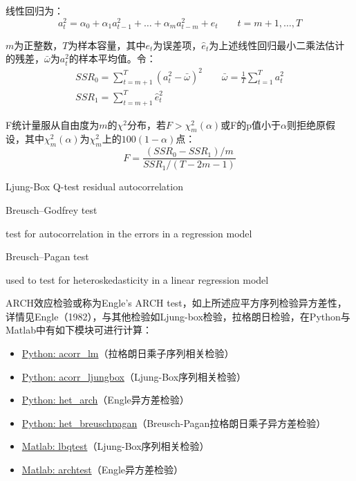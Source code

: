 \documentclass[11pt]{article}
\begin{document}
线性回归为：
\begin{equation*}
    a^2_t = \alpha_0 + \alpha_1 a^{2}_{t-1} + \dots + \alpha_m a^{2}_{t-m} + e_t \qquad t=m+1,\dots,T
\end{equation*}

$m$为正整数，$T$为样本容量，其中$e_t$为误差项，$\hat{e}_t$为上述线性回归最小二乘法估计的残差，$\bar{\omega}$为$a_t^2$的样本平均值。令：
\begin{gather*}
    SSR_0 = \sum_{t=m+1}^{T} (a_t^2 - \bar{\omega})^2 \qquad
    \bar{\omega} = \frac{1}{T} \sum_{t=1}^{T} a_t^2 \\
    SSR_1 = \sum_{t=m+1}^{T} \hat{e}_t^2
\end{gather*}

F统计量服从自由度为$m$的$\chi^2$分布，若$F>\chi_m^2(\alpha)$或F的p值小于$\alpha$则拒绝原假设，其中$\chi_m^2(\alpha)$为$\chi_m^2$上的$100(1-\alpha)$点：
\begin{equation*}
    F = \frac{(SSR_0-SSR_1)/m}{SSR_1/(T-2m-1)}
\end{equation*}

Ljung-Box Q-test
residual autocorrelation

Breusch–Godfrey test

test for autocorrelation in the errors in a regression model

Breusch–Pagan test

used to test for heteroskedasticity in a linear regression model

\begin{remark}
    ARCH效应检验或称为Engle's ARCH test，如上所述应平方序列检验异方差性，详情见Engle（1982），与其他检验如Ljung-box检验，拉格朗日检验，在Python与Matlab中有如下模块可进行计算：
    \begin{itemize}
        \item \href{https://www.statsmodels.org/stable/generated/statsmodels.stats.diagnostic.acorr_lm.html}{Python: acorr\_lm}（拉格朗日乘子序列相关检验）
        \item \href{https://www.statsmodels.org/stable/generated/statsmodels.stats.diagnostic.acorr\_ljungbox.html}{Python: acorr\_ljungbox}（Ljung-Box序列相关检验）
        \item \href{https://www.statsmodels.org/stable/generated/statsmodels.stats.diagnostic.het\_arch.html}{Python: het\_arch}（Engle异方差检验）
        \item \href{https://www.statsmodels.org/stable/generated/statsmodels.stats.diagnostic.het\_breuschpagan.html}{Python: het\_breuschpagan}（Breusch-Pagan拉格朗日乘子异方差检验）
        \item \href{https://www.mathworks.com/help/econ/lbqtest.html}{Matlab: lbqtest}（Ljung-Box序列相关检验）
        \item \href{https://www.mathworks.com/help/econ/archtest.html}{Matlab: archtest}（Engle异方差检验）
    \end{itemize}
\end{remark}
\end{document}
